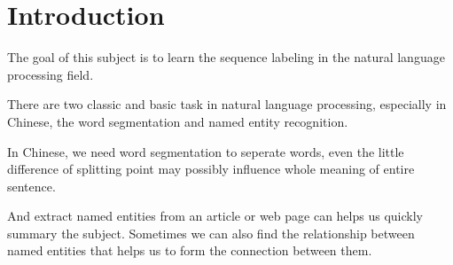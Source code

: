 \section{Introduction}
\label{sec:introduction}

The goal of this subject is to learn the sequence labeling in the natural language processing field.

There are two classic and basic task in natural language processing, especially in Chinese, the word segmentation and named entity recognition.

In Chinese, we need word segmentation to seperate words, even the little difference of splitting point may possibly influence whole meaning of entire sentence.

And extract named entities from an article or web page can helps us quickly summary the subject. Sometimes we can also find the relationship between named entities that helps us to form the connection between them.




